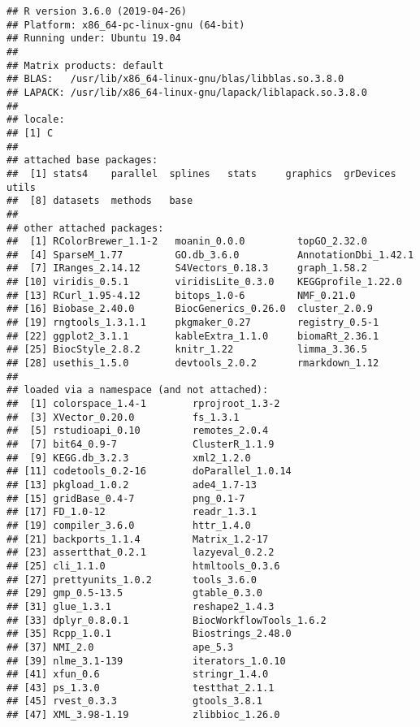 \documentclass[9pt,a4paper,]{extarticle}
\begin{document}
\begin{verbatim}
## R version 3.6.0 (2019-04-26)
## Platform: x86_64-pc-linux-gnu (64-bit)
## Running under: Ubuntu 19.04
## 
## Matrix products: default
## BLAS:   /usr/lib/x86_64-linux-gnu/blas/libblas.so.3.8.0
## LAPACK: /usr/lib/x86_64-linux-gnu/lapack/liblapack.so.3.8.0
## 
## locale:
## [1] C
## 
## attached base packages:
##  [1] stats4    parallel  splines   stats     graphics  grDevices utils    
##  [8] datasets  methods   base     
## 
## other attached packages:
##  [1] RColorBrewer_1.1-2   moanin_0.0.0         topGO_2.32.0        
##  [4] SparseM_1.77         GO.db_3.6.0          AnnotationDbi_1.42.1
##  [7] IRanges_2.14.12      S4Vectors_0.18.3     graph_1.58.2        
## [10] viridis_0.5.1        viridisLite_0.3.0    KEGGprofile_1.22.0  
## [13] RCurl_1.95-4.12      bitops_1.0-6         NMF_0.21.0          
## [16] Biobase_2.40.0       BiocGenerics_0.26.0  cluster_2.0.9       
## [19] rngtools_1.3.1.1     pkgmaker_0.27        registry_0.5-1      
## [22] ggplot2_3.1.1        kableExtra_1.1.0     biomaRt_2.36.1      
## [25] BiocStyle_2.8.2      knitr_1.22           limma_3.36.5        
## [28] usethis_1.5.0        devtools_2.0.2       rmarkdown_1.12      
## 
## loaded via a namespace (and not attached):
##  [1] colorspace_1.4-1        rprojroot_1.3-2        
##  [3] XVector_0.20.0          fs_1.3.1               
##  [5] rstudioapi_0.10         remotes_2.0.4          
##  [7] bit64_0.9-7             ClusterR_1.1.9         
##  [9] KEGG.db_3.2.3           xml2_1.2.0             
## [11] codetools_0.2-16        doParallel_1.0.14      
## [13] pkgload_1.0.2           ade4_1.7-13            
## [15] gridBase_0.4-7          png_0.1-7              
## [17] FD_1.0-12               readr_1.3.1            
## [19] compiler_3.6.0          httr_1.4.0             
## [21] backports_1.1.4         Matrix_1.2-17          
## [23] assertthat_0.2.1        lazyeval_0.2.2         
## [25] cli_1.1.0               htmltools_0.3.6        
## [27] prettyunits_1.0.2       tools_3.6.0            
## [29] gmp_0.5-13.5            gtable_0.3.0           
## [31] glue_1.3.1              reshape2_1.4.3         
## [33] dplyr_0.8.0.1           BiocWorkflowTools_1.6.2
## [35] Rcpp_1.0.1              Biostrings_2.48.0      
## [37] NMI_2.0                 ape_5.3                
## [39] nlme_3.1-139            iterators_1.0.10       
## [41] xfun_0.6                stringr_1.4.0          
## [43] ps_1.3.0                testthat_2.1.1         
## [45] rvest_0.3.3             gtools_3.8.1           
## [47] XML_3.98-1.19           zlibbioc_1.26.0        

\end{verbatim}
\end{document}
